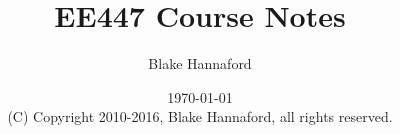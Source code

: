 \documentclass[letterpaper]{book}
\begin{document}
%


\frontmatter

\title{EE447 Course Notes}

\author{Blake Hannaford}

\date{\today\\(C) Copyright 2010-2016, Blake Hannaford, all rights reserved. }

\maketitle


\mainmatter



\setcounter{chapter}{8}


%
% 

%
\label{LastPage}
\end{document}
